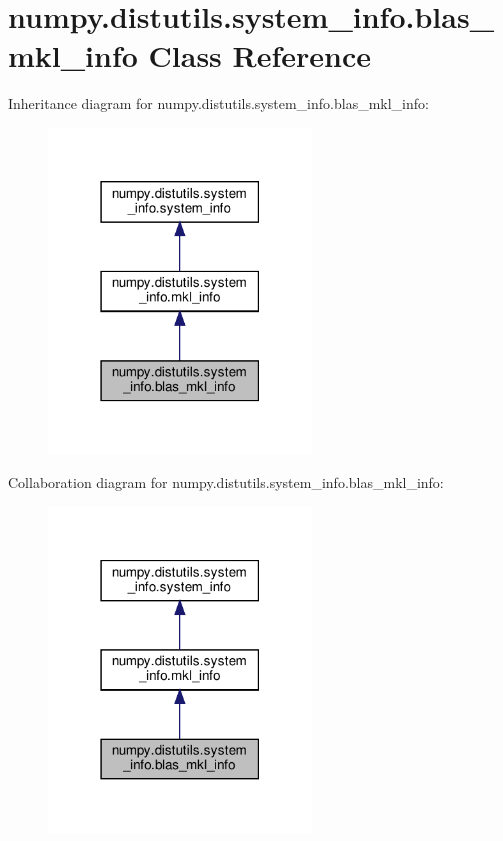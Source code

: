 \hypertarget{classnumpy_1_1distutils_1_1system__info_1_1blas__mkl__info}{}\section{numpy.\+distutils.\+system\+\_\+info.\+blas\+\_\+mkl\+\_\+info Class Reference}
\label{classnumpy_1_1distutils_1_1system__info_1_1blas__mkl__info}


Inheritance diagram for numpy.\+distutils.\+system\+\_\+info.\+blas\+\_\+mkl\+\_\+info\+:
\nopagebreak
\begin{figure}[H]
\begin{center}
\leavevmode
\includegraphics[width=198pt]{classnumpy_1_1distutils_1_1system__info_1_1blas__mkl__info__inherit__graph}
\end{center}
\end{figure}


Collaboration diagram for numpy.\+distutils.\+system\+\_\+info.\+blas\+\_\+mkl\+\_\+info\+:
\nopagebreak
\begin{figure}[H]
\begin{center}
\leavevmode
\includegraphics[width=198pt]{classnumpy_1_1distutils_1_1system__info_1_1blas__mkl__info__coll__graph}
\end{center}
\end{figure}
